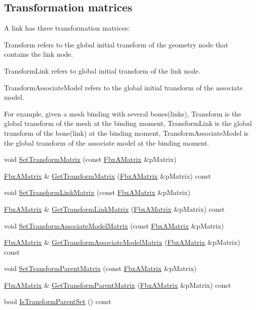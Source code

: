 \subsection*{Transformation matrices}
\label{_amgrp7836ca86145da40e5bc86dfa5a0c5639}%
A link has three transformation matrices\+: \begin{DoxyItemize}
\item Transform refers to the global initial transform of the geometry node that contains the link node. \item Transform\+Link refers to global initial transform of the link node. \item Transform\+Associate\+Model refers to the global initial transform of the associate model.\end{DoxyItemize}
For example, given a mesh binding with several bones(links), Transform is the global transform of the mesh at the binding moment, Transform\+Link is the global transform of the bone(link) at the binding moment, Transform\+Associate\+Model is the global transform of the associate model at the binding moment. \begin{DoxyCompactItemize}
\item 
void \hyperlink{class_fbx_cluster_a93ec68575bffb98c18caac76341b0323}{Set\+Transform\+Matrix} (const \hyperlink{class_fbx_a_matrix}{Fbx\+A\+Matrix} \&p\+Matrix)
\item 
\hyperlink{class_fbx_a_matrix}{Fbx\+A\+Matrix} \& \hyperlink{class_fbx_cluster_a6da90436aeb9b7eeaefafff3bc617206}{Get\+Transform\+Matrix} (\hyperlink{class_fbx_a_matrix}{Fbx\+A\+Matrix} \&p\+Matrix) const
\item 
void \hyperlink{class_fbx_cluster_aa7d541a302bab3e32403968ba4ebc19c}{Set\+Transform\+Link\+Matrix} (const \hyperlink{class_fbx_a_matrix}{Fbx\+A\+Matrix} \&p\+Matrix)
\item 
\hyperlink{class_fbx_a_matrix}{Fbx\+A\+Matrix} \& \hyperlink{class_fbx_cluster_a6a45e225e66240b14af3f6543141119b}{Get\+Transform\+Link\+Matrix} (\hyperlink{class_fbx_a_matrix}{Fbx\+A\+Matrix} \&p\+Matrix) const
\item 
void \hyperlink{class_fbx_cluster_a8fd73a9d50d6bf35146c524cb49871aa}{Set\+Transform\+Associate\+Model\+Matrix} (const \hyperlink{class_fbx_a_matrix}{Fbx\+A\+Matrix} \&p\+Matrix)
\item 
\hyperlink{class_fbx_a_matrix}{Fbx\+A\+Matrix} \& \hyperlink{class_fbx_cluster_a47228a06a38257e983f42a349a2d3fb0}{Get\+Transform\+Associate\+Model\+Matrix} (\hyperlink{class_fbx_a_matrix}{Fbx\+A\+Matrix} \&p\+Matrix) const
\item 
void \hyperlink{class_fbx_cluster_a900f6774195ee098f945aa1d07a4a283}{Set\+Transform\+Parent\+Matrix} (const \hyperlink{class_fbx_a_matrix}{Fbx\+A\+Matrix} \&p\+Matrix)
\item 
\hyperlink{class_fbx_a_matrix}{Fbx\+A\+Matrix} \& \hyperlink{class_fbx_cluster_a715efef69d8dab149415c7b47a1257bc}{Get\+Transform\+Parent\+Matrix} (\hyperlink{class_fbx_a_matrix}{Fbx\+A\+Matrix} \&p\+Matrix) const
\item 
bool \hyperlink{class_fbx_cluster_a1a9904707814b3a1fea61f4c35152fa5}{Is\+Transform\+Parent\+Set} () const
\end{DoxyCompactItemize}
